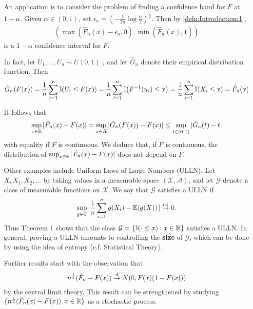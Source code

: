 An application is to consider the problem of finding a confidence band
for $F$ at $1-\alpha$. Given $\alpha \in (0, 1)$, set $\epsilon_{n}
=(-\frac{1}{2n} \log \frac{\alpha}{2})^{\frac{1}{2}}$.  Then by
\ref{defn:Introduction:1},
\begin{align}
  \label{eq:8}
  (\max(\hat F_{n}(x) - \epsilon_{n}, 0), \min(\hat F_{n}(x), 1))
\end{align} is a $1-\alpha$ confidence interval for $F$.

In fact, let $U_{1}, \dots, U_{n} \sim U(0, 1)$ \iid, and let $\hat
G_{n}$ denote their empirical distribution function.  Then
\begin{align}
  \label{eq:9}
  \hat G_{n}(F(x)) = \frac{1}{n} \sum_{i=1}^{n} \I{U_{i} \leq F(x)} =
  \frac{1}{n} \sum_{i=1}^{n} \I{F^{-1}(u_{i}) \leq x} = \frac{1}{n}
  \sum_{i=1}^{n} \I{X_{i} \leq x} = \hat F_{n}(x)
\end{align}

It follows that
\begin{align}
  \label{eq:10}
  \sup_{x \in \mathbb{R}} |\hat F_{n}(x)- F(x)| = \sup_{x \in R} |\hat
  G_{n}(F(x)) - F(x)| \leq \sup_{t \in (0, 1)} |\hat G_{n}(t) - t |
\end{align} with equality if $F$ is continuous.  We deduce that, if
$F$ is continuous, the distribution of $\sup_{x \in \mathbb{R}} | \hat
F_{n}(x) - F(x)|$ does not depend on $F$.

Other examples include Uniform Laws of Large Numbers (ULLN).  Let
$X, X_{1}, X_{2}, \dots$ be \iid taking values in a measurable space
$(\mathcal{X}, \mathcal{A})$, and let $\mathcal{G}$ denote a class of
measurable functions on $\mathcal{X}$.  We say that $\mathcal{G}$
satisfies a ULLN if
\begin{equation}
  \label{eq:11}
  \sup_{g \in \mathcal{G}} | \frac{1}{n} \sum_{i=1}^{n} g(X_{i}) -
  \E{g(X)}| \cas 0.
\end{equation}
Thus Theorem 1 shows that the class $\mathcal{G} = \{ \I{\cdot \leq
  x}: x \in \R \}$ satisfies a ULLN.  In general, proving a ULLN
amounts to controlling the \textbf{size} of $\mathcal{G}$, which can
be done by using the idea of entropy (c.f. Statistical Theory).

Further results start with the observation that
\begin{align}
  \label{eq:12}
  n^{\frac{1}{2}} (\hat F_{n} - F(x)) \overset{d}{\rightarrow} N(0, F(x)(1-F(x)))
\end{align} by the central limit theory.  This result can be
strengthened by studying $\{ n^{\frac{1}{2}}(\hat F_{n}(x) - F(x)), x
\in \mathbb{R} \}$ as a stochastic process.

